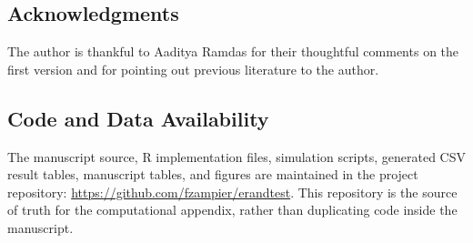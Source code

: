 \documentclass[10pt]{article}
\begin{document}
\subsection{Acknowledgments}

The author is thankful to Aaditya Ramdas for their thoughtful comments on the first version and for pointing out previous literature to the author.

\subsection{Code and Data Availability}

The manuscript source, R implementation files, simulation scripts, generated CSV result tables, manuscript tables, and figures are maintained in the project repository: \url{https://github.com/fzampier/erandtest}. This repository is the source of truth for the computational appendix, rather than duplicating code inside the manuscript.
\end{document}
